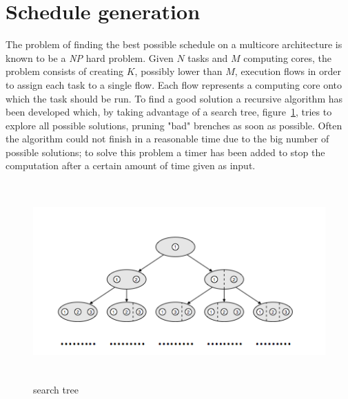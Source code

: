 \documentclass[a4paper,11pt,oneside]{book}
\begin{document}
\section{Schedule generation}

The problem of finding the best possible schedule on a multicore architecture is known to be a \emph{NP} hard problem. Given $N$ tasks and $M$ computing cores, the problem consists of creating $K$, possibly lower than $M$, execution flows in order to assign each task to a single flow. Each flow represents a computing core onto which the task should be run. To find a good solution a recursive algorithm has been developed which, by taking advantage of a search tree, figure~\ref{search_tree}, tries to explore all possible solutions, pruning "bad" brenches as soon as possible. Often the algorithm could not finish in a reasonable time due to the big number of possible solutions; to solve this problem a timer has been added to stop the computation after a certain amount of time given as input. \\

\begin{figure}[H]
\centering
\includegraphics[width = 130mm, height = 76mm]{search_tree.png}
\caption{search tree}
\label{search_tree}
\end{figure}
\end{document}
